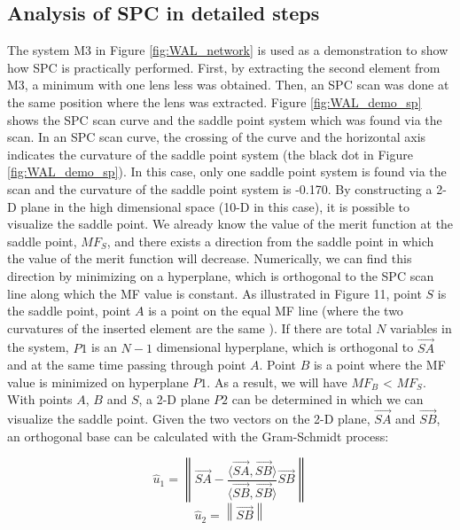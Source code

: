 \subsection{Analysis of SPC in detailed steps}

The system M3 in Figure \ref{fig:WAL_network} is used as a demonstration to show how SPC is practically performed. First, by extracting the second element from M3, a minimum with one lens less was obtained. Then, an SPC scan was done at the same position where the lens was extracted. Figure \ref{fig:WAL_demo_sp} shows the SPC scan curve and the saddle point system which was found via the scan. In an SPC scan curve, the crossing of the curve and the horizontal axis indicates the curvature of the saddle point system (the black dot in Figure \ref{fig:WAL_demo_sp}). In this case, only one saddle point system is found via the scan and the curvature of the saddle point system is -0.170. By constructing a 2-D plane in the high dimensional space (10-D in this case), it is possible to visualize the saddle point. We already know the value of the merit function at the saddle point, $MF_{S}$, and there exists a direction from the saddle point in which the value of the merit function will decrease. Numerically, we can find this direction by minimizing on a hyperplane, which is orthogonal to the SPC scan line along which the MF value is constant. As illustrated in Figure 11, point $S$ is the saddle point, point $A$ is a point on the equal MF line (where the two curvatures of the inserted element are the same \cite{MVTurnhoutSPC15}). If there are total $N$ variables in the system, $P1$ is an $N-1$ dimensional hyperplane, which is orthogonal to $\overrightarrow{SA}$ and at the same time passing through point $A$. Point $B$ is a point where the MF value is minimized on hyperplane $P1$. As a result, we will have $MF_{B}$ < $MF_{S}$. With points $A$, $B$ and $S$, a 2-D plane $P2$ can be determined in which we can visualize the saddle point. Given the two vectors on the 2-D plane, $\overrightarrow{SA}$ and $\overrightarrow{SB}$, an orthogonal base can be calculated with the Gram-Schmidt process:

\setlength{\belowdisplayshortskip}{5pt}
\setlength{\abovedisplayshortskip}{5pt}
\begin{equation} \label{eq:u1}
\hat{u}_{1} =  \left\| \overrightarrow{SA}-{\frac{\langle \overrightarrow{SA},\overrightarrow{SB}\rangle}{\langle \overrightarrow{SB},\overrightarrow{SB}\rangle}}\overrightarrow{SB} \right\| 
\end{equation}
\setlength{\belowdisplayshortskip}{10pt}
\begin{equation} \label{eq:u2}
\hat{u}_{2} = \left\| \overrightarrow{SB} \right\|
\end{equation}

